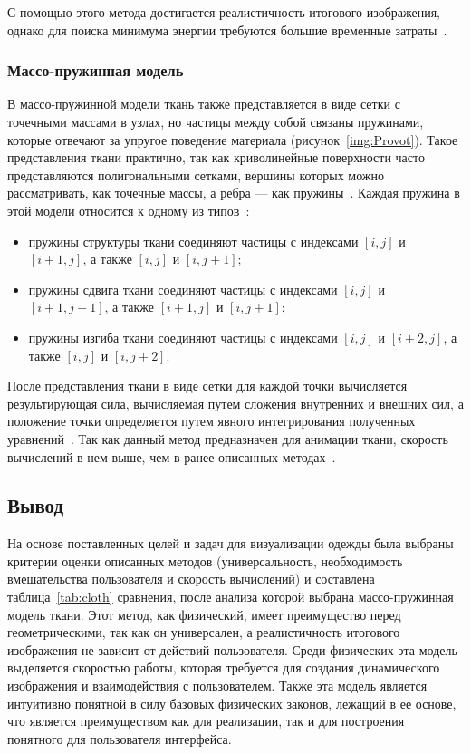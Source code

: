 С помощью этого метода достигается реалистичность итогового изображения, однако
для поиска минимума энергии требуются большие временные затраты~\cite{bib11}.

\subsubsection{Массо-пружинная модель}

В массо-пружинной модели ткань также представляется в виде сетки с точечными
массами в узлах, но частицы между собой связаны пружинами, которые отвечают за
упругое поведение материала (рисунок~\ref{img:Provot}). Такое представления
ткани практично, так как криволинейные поверхности часто представляются
полигональными сетками, вершины которых можно рассматривать, как точечные массы,
а ребра --- как пружины~\cite{bib15}. Каждая пружина в этой модели относится к
одному из типов~\cite{bib14}:
\begin{itemize}[left=\parindent]
    \item пружины структуры ткани соединяют частицы с индексами $[i,j]$
        и $[i+1,j]$, а также $[i,j]$ и $[i, j+1]$;
    \item пружины сдвига ткани соединяют частицы с индексами $[i,j]$ и
        $[i+1,j+1]$, а также $[i+1,j]$ и $[i, j+1]$;
    \item пружины изгиба ткани соединяют частицы с индексами $[i,j]$ и
        $[i+2,j]$, а также $[i,j]$ и $[i, j+2]$.
\end{itemize}


После представления ткани в виде сетки для каждой точки вычисляется
результирующая сила, вычисляемая путем сложения внутренних и внешних сил, а
положение точки определяется путем явного интегрирования полученных
уравнений~\cite{bib11}. Так как данный метод предназначен для анимации ткани,
скорость вычислений в нем выше, чем в ранее описанных методах~\cite{bib14}.

\subsection*{Вывод}

На основе поставленных целей и задач для визуализации одежды была выбраны
критерии оценки описанных методов (универсальность, необходимость вмешательства
пользователя и скорость вычислений) и составлена таблица~\ref{tab:cloth}
сравнения, после анализа которой выбрана массо-пружинная модель ткани. Этот
метод, как физический, имеет преимущество перед геометрическими, так как он
универсален, а реалистичность итогового изображения не зависит от действий
пользователя. Среди физических эта модель выделяется скоростью работы, которая
требуется для создания динамического изображения и взаимодействия с
пользователем. Также эта модель является интуитивно понятной в силу базовых
физических законов, лежащий в ее основе, что является преимуществом как для
реализации, так и для построения понятного для пользователя интерфейса.

